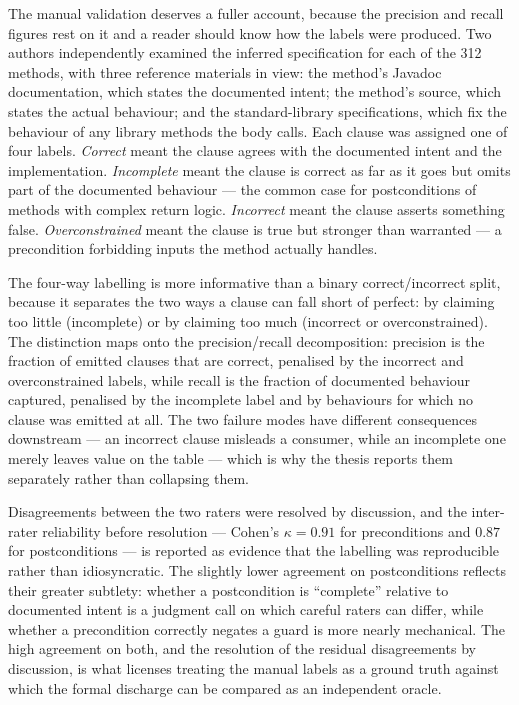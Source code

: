 The manual validation deserves a fuller account, because the precision and recall
figures rest on it and a reader should know how the labels were produced. Two
authors independently examined the inferred specification for each of the 312
methods, with three reference materials in view: the method's Javadoc
documentation, which states the documented intent; the method's source, which
states the actual behaviour; and the standard-library specifications, which fix
the behaviour of any library methods the body calls. Each clause was assigned one
of four labels. \emph{Correct} meant the clause agrees with the documented intent
and the implementation. \emph{Incomplete} meant the clause is correct as far as it
goes but omits part of the documented behaviour --- the common case for
postconditions of methods with complex return logic. \emph{Incorrect} meant the
clause asserts something false. \emph{Overconstrained} meant the clause is true but
stronger than warranted --- a precondition forbidding inputs the method actually
handles.

The four-way labelling is more informative than a binary correct/incorrect split,
because it separates the two ways a clause can fall short of perfect: by claiming
too little (incomplete) or by claiming too much (incorrect or overconstrained). The
distinction maps onto the precision/recall decomposition: precision is the fraction
of emitted clauses that are correct, penalised by the incorrect and overconstrained
labels, while recall is the fraction of documented behaviour captured, penalised by
the incomplete label and by behaviours for which no clause was emitted at all. The
two failure modes have different consequences downstream --- an incorrect clause
misleads a consumer, while an incomplete one merely leaves value on the table ---
which is why the thesis reports them separately rather than collapsing them.

Disagreements between the two raters were resolved by discussion, and the
inter-rater reliability before resolution --- Cohen's $\kappa = 0.91$ for
preconditions and $0.87$ for postconditions --- is reported as evidence that the
labelling was reproducible rather than idiosyncratic. The slightly lower agreement
on postconditions reflects their greater subtlety: whether a postcondition is
``complete'' relative to documented intent is a judgment call on which careful
raters can differ, while whether a precondition correctly negates a guard is more
nearly mechanical. The high agreement on both, and the resolution of the residual
disagreements by discussion, is what licenses treating the manual labels as a
ground truth against which the formal discharge can be compared as an independent
oracle.

